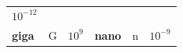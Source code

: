 {\begin{tabular}[t]{|l|l|l|l|l|l|}
                \begin{math}{10}^{-12}\end{math}
     \tabularnewline\cline{1-1}\cline{2-2}\cline{3-3}\cline{4-4}\cline{5-5}\cline{6-6}
    
    
        
                \textbf{giga}
               &
    
    
        G &
    
    
        
                \begin{math}{10}^{9}\end{math}
               &
    
    
        
                \textbf{nano}
               &
    
    
        n &
    
    
        
                \begin{math}{10}^{-9}\end{math}
     \tabularnewline\cline{1-1}\cline{2-2}\cline{3-3}\cline{4-4}\cline{5-5}\cline{6-6}
    

\end{tabular}}
